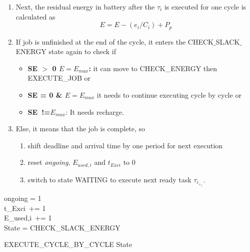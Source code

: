 \documentclass[12pt,hidelinks]{article}
\begin{document}
{\begin{enumerate}
    \item Next, the residual energy in battery after the $\tau_i$ is executed for one cycle is calculated as 
         \begin{equation}
            E = E - (e_i / C_i) + P_p
        \end{equation}
    \item If job is unfinished at the end of the cycle, it enters the CHECK$\_$SLACK$\_$ENERGY state again to check if
    \begin{itemize}
        \item \textbf{SE $>$ 0 \And $E=E_{max}$:} it can move to CHECK\_ENERGY then EXECUTE\_JOB or
        \item \textbf{SE = 0 \& $E=E_{max}$} it needs to continue executing cycle by cycle 
        or 
        \item \textbf{SE\ !=$E_{max}$}: It needs recharge.
    \end{itemize}
    
    \item Else, it means that the job is complete, so 
        \begin{enumerate}
            \item shift deadline and arrival time by one period for next execution
            \item reset \textit{ongoing}, \textit{$E_{used,i}$} and \textit{$t_{Exci}$} to 0
            \item switch to state WAITING to execute next ready task $\tau_i_+_1$.
        \end{enumerate}
\end{enumerate}

\begin{algorithm}[H]
\DontPrintSemicolon
  
   ongoing = 1 \\
   t_{Exci}\  += 1 \\
   E_{used,i}\ += 1 \\
   {State = CHECK\_SLACK\_ENERGY} 
   
\caption{EXECUTE\_CYCLE\_BY\_CYCLE State}
\end{algorithm}
\newpage
}
\end{document}
